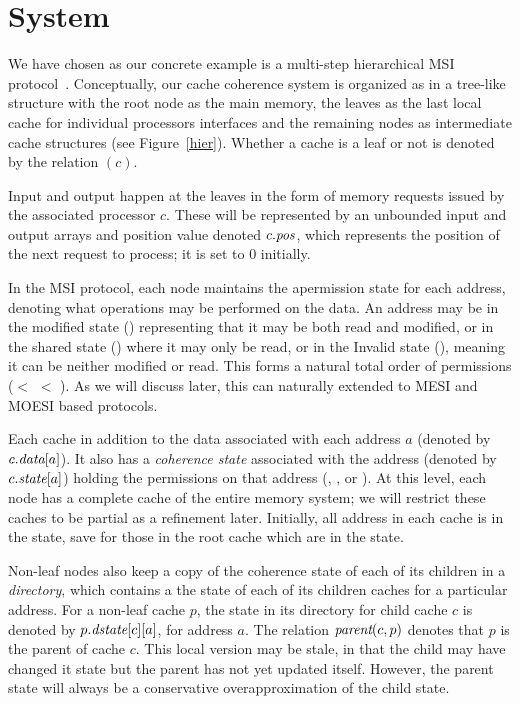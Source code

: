 \section{System}
\label{sec:System}

We have chosen as our concrete example is a multi-step hierarchical
MSI protocol~\cite{MSI}. Conceptually, our cache coherence system is
organized as in a tree-like structure with the root node as the main
memory, the leaves as the last local cache for individual processors
interfaces and the remaining nodes as intermediate cache structures
(see Figure~\ref{hier}). Whether a cache is a leaf or not is denoted
by the relation \leaf$(c)$.

Input and output happen at the leaves in the form of memory requests
issued by the associated processor $c$. These will be represented by
an unbounded input and output arrays and position value denoted
$c.\textit{pos}$, which represents the position of the next request to
process; it is set to $0$ initially.

In the MSI protocol, each node maintains the apermission state for
each address, denoting what operations may be performed on the
data. An address may be in the modified state (\Mo) representing that
it may be both read and modified, or in the shared state (\Sh) where
it may only be read, or in the Invalid state (\In), meaning it can be
neither modified or read. This forms a natural total order of
permissions (\In $<$ \Sh $<$ \Mo). As we will discuss later, this can
naturally extended to MESI and MOESI based protocols.

Each cache in addition to the data associated with each address $a$
(denoted by $c.\textit{data}[a]$). It also has a \emph{coherence state}
associated with the address (denoted by $c.\textit{state}[a]$) holding the
permissions on that address (\Mo, \Sh, or \In). At this level, each
node has a complete cache of the entire memory system; we will
restrict these caches to be partial as a refinement later. Initially,
all address in each cache is in the \In state, save for those in the
root cache which are in the \Mo state.

Non-leaf nodes also keep a copy of the coherence state of each of its
children in a \emph{directory}, which contains a the state of each of
its children caches for a particular address.  For a non-leaf cache
$p$, the state in its directory for child cache $c$ is denoted by
$p.\textit{dstate}[c][a]$, for address $a$.  The relation $\textit{parent}(c, p)$
denotes that $p$ is the parent of cache $c$.  This local version may
be stale, in that the child may have changed it state but the parent
has not yet updated itself. However, the parent state will always be a
conservative overapproximation of the child state.

